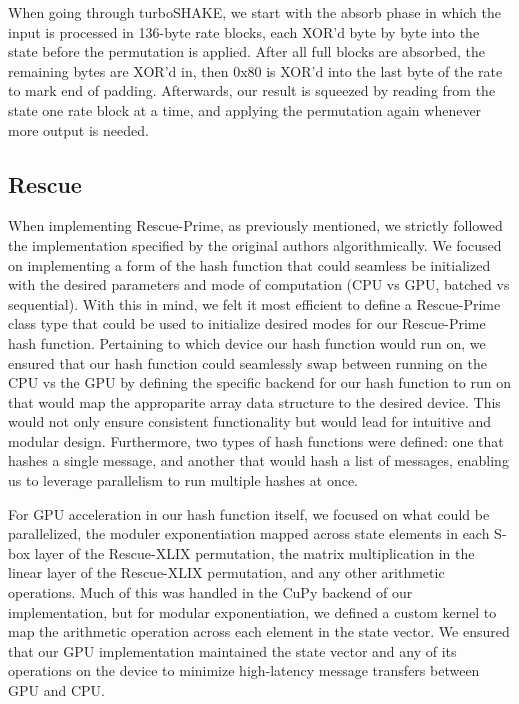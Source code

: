 \documentclass[conference]{IEEEtran}
\begin{document}
When going through turboSHAKE, we start with the absorb phase in which the input is processed in 136-byte rate blocks, each XOR'd byte by byte into the state before the permutation is applied. After all full blocks are absorbed, the remaining bytes are XOR'd in, then 0x80 is XOR'd into the last byte of the rate to mark end of padding. Afterwards, our result is squeezed by reading from the state one rate block at a time, and  applying the permutation again whenever more output is needed.


\subsection{Rescue}

When implementing Rescue-Prime, as previously mentioned, we strictly followed the implementation specified by the original authors algorithmically. We focused on implementing a form of the hash function that could seamless be initialized with the desired parameters and mode of computation (CPU vs GPU, batched vs sequential). With this in mind, we felt it most efficient to define a Rescue-Prime class type that could be used to initialize desired modes for our Rescue-Prime hash function. Pertaining to which device our hash function would run on, we ensured that our hash function could seamlessly swap between running on the CPU vs the GPU by defining the specific backend for our hash function to run on that would map the approparite array data structure to the desired device. This would not only ensure consistent functionality but would lead for intuitive and modular design. Furthermore, two types of hash functions were defined: one that hashes a single message, and another that would hash a list of messages, enabling us to leverage parallelism to run multiple hashes at once.

For GPU acceleration in our hash function itself, we focused on what could be parallelized, the moduler exponentiation mapped across state elements in each S-box layer of the Rescue-XLIX permutation, the matrix multiplication in the linear layer of the Rescue-XLIX permutation, and any other arithmetic operations. Much of this was handled in the CuPy backend of our implementation, but for modular exponentiation, we defined a custom kernel to map the arithmetic operation across each element in the state vector. We ensured that our GPU implementation maintained the state vector and any of its operations on the device to minimize high-latency message transfers between GPU and CPU.
\end{document}
